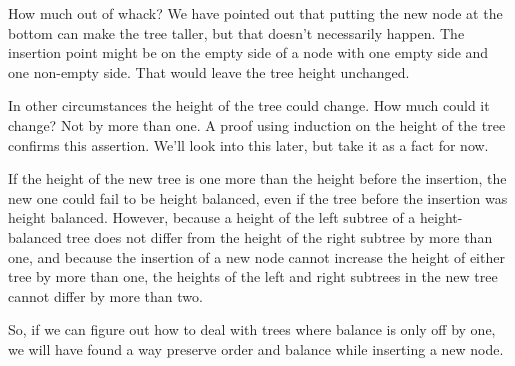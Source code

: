 How much out of whack?
We have pointed out that
putting the new node at the bottom can make the tree taller,
but that doesn't necessarily happen.
The insertion point might be on the
empty side of a node with one empty side and one non-empty side.
That would leave the tree height unchanged.

In other circumstances the height of the tree could change.
How much could it change?
Not by more than one.
A proof using induction on the height of the tree
confirms this assertion.
We'll look into this later, but take it as a fact for now.

If the height of the new tree is one more than the
height before the insertion, the new one could fail to be height balanced,
even if the tree before the insertion was height balanced.
However, because a height of the left subtree of a
height-balanced tree does not differ from the height of
the right subtree by more than one,
and because the insertion of a new node cannot increase
the height of either tree by more than one,
the heights of the left and right subtrees in the new tree
cannot differ by more than two.

So, if we can figure out how to deal with trees where
balance is only off by one,
we will have found a way preserve order and balance
while inserting a new node.


